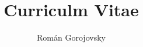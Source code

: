 \usepackage[activeacute]{babel}
\usepackage{fancyhdr}

\oddsidemargin 0in
\textwidth 6.2in
\topmargin 0in
\addtolength{\topmargin}{-.5in}
\textheight 9.6in
\pagestyle{fancy}

\title{Curriculm Vitae}
\author{Rom\'{a}n Gorojovsky}


